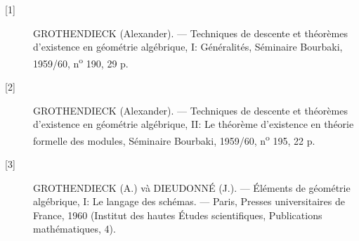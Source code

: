 \begin{description}
\item[{[1]}] GROTHENDIECK (Alexander). --- Techniques de descente et théorèmes
d'existence en géométrie algébrique, I: Généralités, Séminaire Bourbaki,
1959/60, n\textsuperscript{o} 190, 29 p.

\item[{[2]}] GROTHENDIECK (Alexander). --- Techniques de descente et théorèmes
d'existence en géométrie algébrique, II: Le théorème d'existence en théorie
formelle des modules, Séminaire Bourbaki, 1959/60,
n\textsuperscript{o} 195, 22 p.

\item[{[3]}] GROTHENDIECK (A.) và DIEUDONNÉ (J.). --- Éléments de géométrie
algébrique, I: Le langage des schémas. --- Paris, Presses universitaires de
France, 1960 (Institut des hautes Études scientifiques, Publications
mathématiques, 4).
\end{description}
